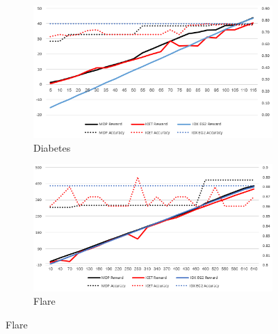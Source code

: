 \documentclass[letterpaper]{article}
\theoremstyle{definition}
\begin{document}
\begin{figure}[ht]
    \begin{subfigure}[t]{0.45\textwidth}\vskip 0pt
		\centering
		\includegraphics[scale=0.5]{Diabetes}
		\caption{Diabetes}\label{fig:Diabetes}		
	\end{subfigure}
    \quad
    \begin{subfigure}[t]{0.45\textwidth}\vskip 0pt
		\centering
		\includegraphics[scale=0.5]{Flare}
		\caption{Flare}\label{fig:Flare}		
	\end{subfigure}
    \quad
    

\end{figure}
\end{document}
